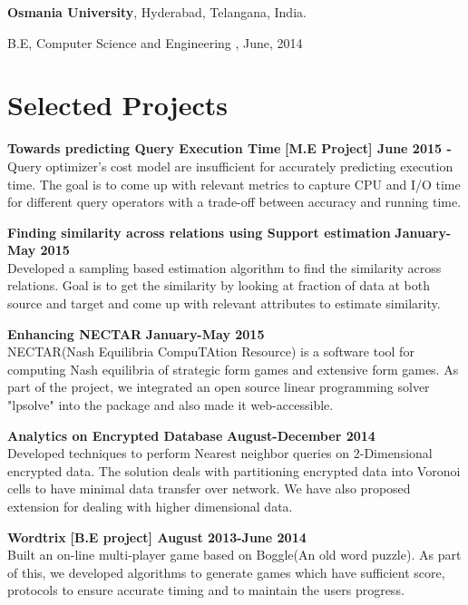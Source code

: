 \documentclass[margin,line]{res}
\newenvironment{list1}{
  \begin{list}{\ding{113}}{%
      \setlength{\itemsep}{0in}
      \setlength{\parsep}{0in} \setlength{\parskip}{0in}
      \setlength{\topsep}{0in} \setlength{\partopsep}{0in} 
      \setlength{\leftmargin}{0.17in}}}{\end{list}}
\begin{document}
\begin{resume}
{\bf Osmania University}, Hyderabad, Telangana, India.\\
\vspace*{-.1in}
\begin{list1}
\item[] B.E, Computer Science and Engineering ,  June, 2014
\end{list1}

\section{\sc Selected Projects}
{\bf Towards predicting Query Execution Time}
\hfill {\bf [M.E Project] June 2015  - }\\
Query optimizer's cost model are insufficient for accurately predicting execution time. The goal is to come up with relevant metrics to capture CPU and I/O time for different query operators with a trade-off between accuracy and running time. 

{\bf Finding similarity across relations using Support estimation}
\hfill {\bf January-May 2015}\\
Developed a sampling based estimation algorithm to find the similarity across relations. Goal is to get the similarity by looking at fraction of data at both source and target and come up with relevant attributes to estimate similarity. 

{\bf Enhancing NECTAR}
\hfill {\bf  January-May 2015}\\
NECTAR(Nash Equilibria CompuTAtion Resource) is a software tool for computing Nash equilibria of strategic form games and extensive form games. As part of the project, we integrated an open source linear programming solver "lpsolve" into the package and also made it web-accessible.

{\bf Analytics on Encrypted Database}
\hfill {\bf  August-December 2014}\\
Developed techniques to perform Nearest neighbor queries on 2-Dimensional encrypted data. The solution deals with partitioning encrypted  data into Voronoi cells to have minimal data transfer over network. We have also proposed extension for dealing with higher dimensional data.

{\bf Wordtrix}
\hfill {\bf  [B.E project] August 2013-June 2014}\\
Built an on-line multi-player game based on Boggle(An old word puzzle). As part of this, we developed algorithms to generate games which have sufficient score, protocols to ensure accurate timing and to maintain the users progress. 


\end{resume}
\end{document}
